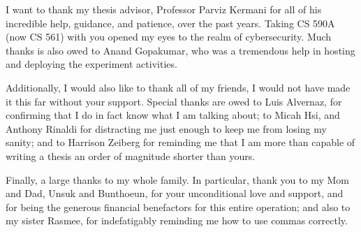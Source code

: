 \providecommand{\heading}[1]{\section{#1}}
\providecommand{\subheading}[1]{\subsection{#1}}

I want to thank my thesis advisor, Professor Parviz Kermani for all of his incredible help, guidance, and patience, over the past years. %
Taking CS 590A (now CS 561) with you opened my eyes to the realm of cybersecurity. %
Much thanks is also owed to Anand Gopakumar, who was a tremendous help in hosting and deploying the experiment activities. 
	
Additionally, I would also like to thank all of my friends, I would not have made it this far without your support. %
Special thanks are owed to Luis Alvernaz, for confirming that I do in fact know what I am talking about; %
to Micah Hsi, and Anthony Rinaldi for distracting me just enough to keep me from losing my sanity; %
and to Harrison Zeiberg for reminding me that I am more than capable of writing a thesis an order of magnitude shorter than yours. 

Finally, a large thanks to my whole family. %
In particular, thank you to my Mom and Dad, Unsuk and Bunthoeun, for your unconditional love and support, and for being the generous financial benefactors for this entire operation; %
and also to my sister Rasmee, for indefatigably reminding me how to use commas correctly.